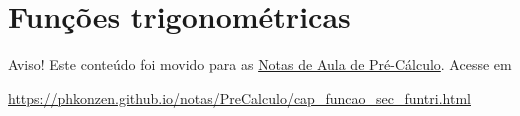 \section{Funções trigonométricas}\label{cap_funcao_sec_funtri}

\begin{center}
  Aviso! Este conteúdo foi movido para as \href{https://phkonzen.github.io/notas/PreCalculo/main.html}{Notas de Aula de Pré-Cálculo}. Acesse em

  \url{https://phkonzen.github.io/notas/PreCalculo/cap_funcao_sec_funtri.html}
\end{center}






